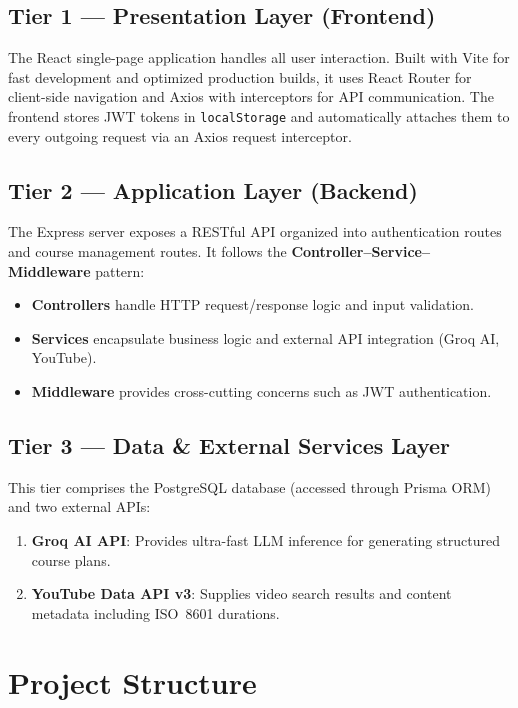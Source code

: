 \documentclass[12pt,a4paper]{report}
\begin{document}
\subsection{Tier 1 — Presentation Layer (Frontend)}
The React single-page application handles all user interaction. Built with Vite for fast development and optimized production builds, it uses React Router for client-side navigation and Axios with interceptors for API communication. The frontend stores JWT tokens in \texttt{localStorage} and automatically attaches them to every outgoing request via an Axios request interceptor.

\subsection{Tier 2 — Application Layer (Backend)}
The Express server exposes a RESTful API organized into authentication routes and course management routes. It follows the \textbf{Controller--Service--Middleware} pattern:

\begin{itemize}[noitemsep]
    \item \textbf{Controllers} handle HTTP request/response logic and input validation.
    \item \textbf{Services} encapsulate business logic and external API integration (Groq AI, YouTube).
    \item \textbf{Middleware} provides cross-cutting concerns such as JWT authentication.
\end{itemize}

\subsection{Tier 3 — Data \& External Services Layer}
This tier comprises the PostgreSQL database (accessed through Prisma ORM) and two external APIs:

\begin{enumerate}[noitemsep]
    \item \textbf{Groq AI API}: Provides ultra-fast LLM inference for generating structured course plans.
    \item \textbf{YouTube Data API v3}: Supplies video search results and content metadata including ISO~8601 durations.
\end{enumerate}

\section{Project Structure}
\end{document}
